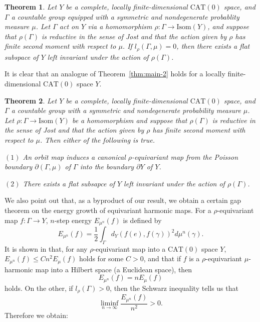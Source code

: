 \documentclass[12pt]{amsart}
\numberwithin{equation}{section}
\theoremstyle{plain}
\newtheorem{Main}{Theorem}
\theoremstyle{definition}
\theoremstyle{remark}
\newcommand{\ene}[1]{E_{#1}}
\newcommand{\isom}[1]{\mathrm{Isom}({#1})}
\newcommand{\cat}[1]{\mathrm{CAT}(#1)}
\begin{document}
\begin{Main}
\label{thm:main-3}
 Let $Y$ be a complete, locally finite-dimensional $\cat{0}$ space,  
 and $\Gamma$ a countable group equipped with a symmetric and 
 nondegenerate probablity measure $\mu$. 
 Let $\Gamma$ act on $Y$ via a homomorphism 
 $\rho\colon \Gamma \rightarrow \isom{Y}$, and 
 suppose that $\rho(\Gamma)$ is 
 reductive in the sense of Jost and that the action given by
 $\rho$ has finite second moment with respect to $\mu$.
 If  $l_{\rho}(\Gamma,\mu)=0$,  then there exists a flat subspace
 of $Y$ left invariant under the action of $\rho(\Gamma)$. 
\end{Main}

 It is clear that an analogue of Theorem~\ref{thm:main-2} holds for a 
 locally finite-dimensional $\cat{0}$ space $Y$. 

\begin{Main}
\label{thm:main-4}
 Let $Y$ be a complete, locally finite-dimensional $\cat{0}$ space,
 and $\Gamma$ a countable group
 with a symmetric and nondegenerate probability measure $\mu$.
 Let $\rho\colon \Gamma \rightarrow \isom{Y}$ be a homomorphism and 
 suppose that $\rho(\Gamma)$ is 
 reductive in the sense of Jost and that the action given by
 $\rho$ has finite second moment with respect to $\mu$.
 Then either of the following is true. 

  $(1)$ An orbit map induces a canonical $\rho$-equivariant map from the
 Poisson boundary $\partial (\Gamma,\mu)$ of $\Gamma$ into the boundary
 $\partial Y$ of $Y$. 

 $(2)$ There exists a flat subsapce of $Y$ left invariant under the
 action of $\rho(\Gamma)$. 
\end{Main}


 We also point out that, as a byproduct of our result, we obtain
 a certain gap theorem on the energy growth of equivariant harmonic
 maps. 
 For a $\rho$-equivariant map $f\colon \Gamma \rightarrow Y$, 
 $n$-step energy $\ene{\mu^n}(f)$ is defined by
\begin{equation*}
 \ene{\mu^n}(f) = 
 \frac{1}{2} \int_{\Gamma} d_Y(f(e),f(\gamma))^2 d\mu^n(\gamma). 
\end{equation*}
 It is shown in \cite{izeki-kondo-nayatani1} that, 
 for any $\rho$-equivariant map into a $\cat{0}$ space $Y$,  
 $\ene{\mu^n}(f)\leq Cn^2\ene{\mu}(f)$ holds for some $C>0$, and 
 that if $f$ is a $\rho$-equivariant $\mu$-harmonic map into a Hilbert
 space (a Euclidean space), then 
\begin{equation*}
 \ene{\mu^n}(f) = n \ene{\mu}(f)
\end{equation*}
 holds. 
 On the other, if $l_{\rho}(\Gamma)>0$, then the Schwarz inequality
 tells us that 
\begin{equation*}
 \liminf_{n\to \infty} \frac{\ene{\mu^n}(f)}{n^2} > 0.
\end{equation*}
 Therefore we obtain: 
\end{document}
